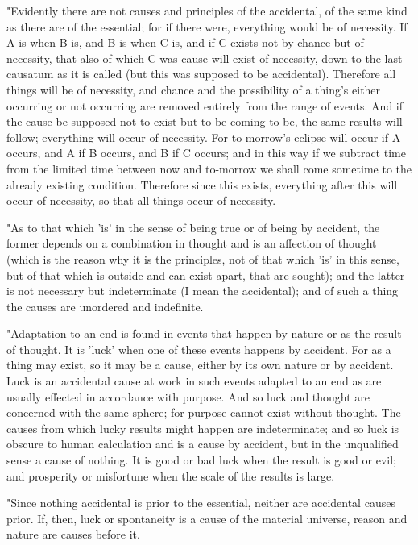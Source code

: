 "Evidently there are not causes and principles of the accidental,
of the same kind as there are of the essential; for if there were,
everything would be of necessity. If A is when B is, and B is when
C is, and if C exists not by chance but of necessity, that also of
which C was cause will exist of necessity, down to the last causatum
as it is called (but this was supposed to be accidental). Therefore
all things will be of necessity, and chance and the possibility of
a thing's either occurring or not occurring are removed entirely from
the range of events. And if the cause be supposed not to exist but
to be coming to be, the same results will follow; everything will
occur of necessity. For to-morrow's eclipse will occur if A occurs,
and A if B occurs, and B if C occurs; and in this way if we subtract
time from the limited time between now and to-morrow we shall come
sometime to the already existing condition. Therefore since this exists,
everything after this will occur of necessity, so that all things
occur of necessity. 

"As to that which 'is' in the sense of being true or of being by accident,
the former depends on a combination in thought and is an affection
of thought (which is the reason why it is the principles, not of that
which 'is' in this sense, but of that which is outside and can exist
apart, that are sought); and the latter is not necessary but indeterminate
(I mean the accidental); and of such a thing the causes are unordered
and indefinite. 

"Adaptation to an end is found in events that happen by nature or
as the result of thought. It is 'luck' when one of these events happens
by accident. For as a thing may exist, so it may be a cause, either
by its own nature or by accident. Luck is an accidental cause at work
in such events adapted to an end as are usually effected in accordance
with purpose. And so luck and thought are concerned with the same
sphere; for purpose cannot exist without thought. The causes from
which lucky results might happen are indeterminate; and so luck is
obscure to human calculation and is a cause by accident, but in the
unqualified sense a cause of nothing. It is good or bad luck when
the result is good or evil; and prosperity or misfortune when the
scale of the results is large. 

"Since nothing accidental is prior to the essential, neither are accidental
causes prior. If, then, luck or spontaneity is a cause of the material
universe, reason and nature are causes before it. 

